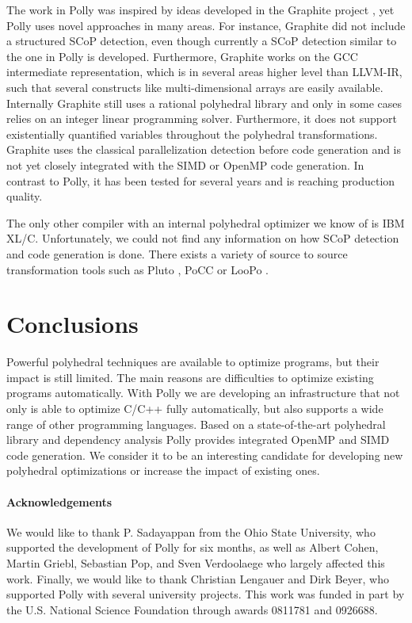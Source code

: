 \documentclass{acm_proc_article-sp}
\begin{document}
The work in Polly was inspired by ideas developed in the Graphite project \cite{TRIFUNOVIC:2010},
yet Polly uses novel approaches in many areas. For instance, Graphite did not
include a structured SCoP detection, even though currently a SCoP detection
similar to the one in Polly is developed.  Furthermore, Graphite works on the
GCC intermediate representation, which is in several areas higher level than
LLVM-IR, such that several constructs like multi-dimensional arrays are easily
available.  Internally Graphite still uses a rational polyhedral library and
only in some cases relies on an integer linear programming solver.
Furthermore, it does not support existentially quantified variables throughout
the polyhedral transformations.  Graphite
uses the classical parallelization detection before code generation and is
not yet closely integrated with the SIMD or OpenMP code generation. In contrast
to Polly, it has been tested for several years and is reaching production quality.

The only other compiler with an internal polyhedral optimizer we know of is 
IBM XL/C. Unfortunately, we could not find any information on how SCoP detection
and code generation is done.
There exists a variety of source to source transformation tools
such as Pluto \cite{uday08pldi}, PoCC or LooPo \cite{loopo}.

\section{Conclusions} Powerful polyhedral techniques are available to optimize
programs, but their impact is still limited. The main reasons are difficulties
to optimize existing programs automatically. With Polly we are developing an
infrastructure that not only is able to optimize C/C++ fully automatically, but also supports a
wide range of other programming languages. Based on a state-of-the-art
polyhedral library and dependency analysis Polly provides integrated OpenMP and
SIMD code generation.  We consider it to be an interesting candidate for
developing new polyhedral optimizations or increase the impact of existing
ones.
\paragraph*{Acknowledgements}
We would like to
thank P.  Sadayappan from the Ohio State University, who supported the development of Polly for six months, as
well as
Albert Cohen,
Martin Griebl,
Sebastian Pop,
and Sven Verdoolaege
who 
largely affected this work.  Finally, we would like to thank Christian Lengauer
and Dirk Beyer, who supported Polly with several university projects.  This
work was funded in part by the U.S. National Science Foundation through awards
0811781 and 0926688.


\end{document}
